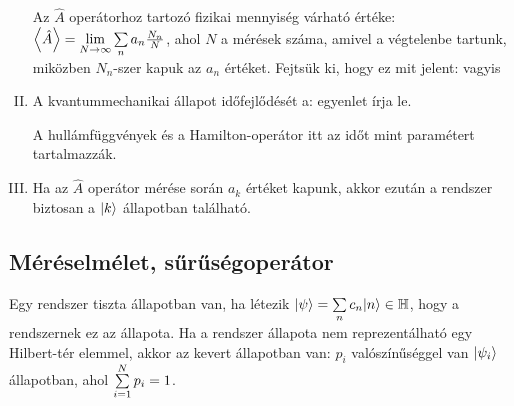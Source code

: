 \begin{enumerate}[I.]
    Az $\hat{A}$ operátorhoz tartozó fizikai mennyiség várható értéke: $\left\langle\hat{A}\right\rangle=\lim\limits_{N\to\infty}{\sum\limits_{n}^{}a_n\frac{N_n}{N}}$, ahol $N$ a mérések száma, amivel a végtelenbe tartunk, miközben $N_n$-szer kapuk az $a_n$ értéket. Fejtsük ki, hogy ez mit jelent:
    vagyis 
    \item A kvantummechanikai állapot időfejlődését a:
    egyenlet írja le.
    
    A hullámfüggvények és a Hamilton-operátor itt az időt mint paramétert tartalmazzák. 
    \item Ha az $\hat{A}$ operátor mérése során $a_k$ értéket kapunk, akkor ezután a rendszer biztosan a $\lvert k\rangle$ állapotban található.
   \end{enumerate}
   
  \subsection{Méréselmélet, sűrűségoperátor}\label{ss:01-mereselmelet}
   
   Egy rendszer tiszta állapotban van, ha létezik $\lvert\psi\rangle=\sum\limits_{n}^{}c_n\lvert n\rangle\in\mathbb{H}$, hogy a rendszernek ez az állapota. Ha a rendszer állapota nem reprezentálható egy Hilbert-tér elemmel, akkor az kevert állapotban van: $p_i$ valószínűséggel van $\lvert\psi_i\rangle$ állapotban, ahol $\sum\limits_{i=1}^{N}p_i=1$. 
   
